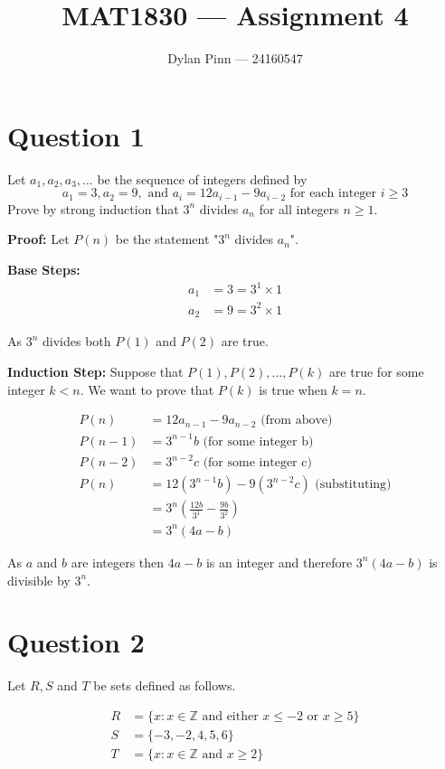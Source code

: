\documentclass[11pt]{article}
\begin{document}
\title{MAT1830 --- Assignment 4}
\author{Dylan Pinn --- 24160547}
\maketitle

\section*{Question 1}
Let $a_1,a_2,a_3,\dots$ be the sequence of integers defined by
$$a_1=3,a_2=9,\text{ and } a_i=12a_{i-1}-9a_{i-2} \text{ for each integer } i \geq 3$$
Prove by strong induction that $3^n$ divides $a_n$ for all integers $n \geq1$.

\textbf{Proof:} Let $P(n)$ be the statement "$3^n$ divides $a_n$".

\textbf{Base Steps:}
\begin{align*}
	a_1 &= 3 = 3^1 \times 1 \\
	a_2 &= 9 = 3^2 \times 1
\end{align*}

As $3^n$ divides both $P(1)$ and $P(2)$ are true.

\textbf{Induction Step:}
Suppose that $P(1),P(2),\dots,P(k)$ are true for some integer $k < n$. We want to prove that $P(k)$ is true when $k = n$.

\begin{align*}
	P(n) &= 12a_{n-1} - 9a_{n-2} \text{ (from above) } \\
	P(n-1) &= 3^{n-1}b \text{ (for some integer b)} \\
	P(n-2) &= 3^{n-2}c \text{ (for some integer c)} \\
	P(n) &= 12(3^{n-1}b) - 9(3^{n-2}c) \text{ (substituting)} \\
	&= 3^n(\frac{12b}{3^1} - \frac{9b}{3^2}) \\
	&= 3^n(4a - b)
\end{align*}

As $a$ and $b$ are integers then $4a-b$ is an integer and therefore $3^n(4a-b)$ is divisible by $3^n$.

\break
\section*{Question 2}
Let $R,S$ and $T$ be sets defined as follows.

\begin{align*}
	R &= \{ x: x \in \mathbb{Z} \text{ and either } x \leq -2 \text{ or } x \geq 5 \} \\
	S &= \{ -3,-2,4,5,6 \} \\
	T &= \{ x: x \in \mathbb{Z} \text{ and } x \geq 2 \}
\end{align*}
\end{document}
